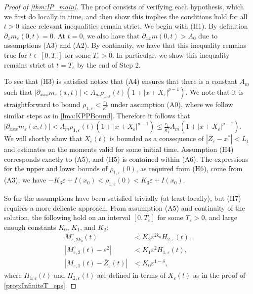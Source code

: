 \documentclass[]{article}
\theoremstyle{remark}
\begin{document}
\begin{proof}[{Proof of \cref{thm:IP_main}}]
The proof consists of verifying each hypothesis, which we first do locally in time, and then show this implies the conditions hold for all $t>0$ since relevant inequalities remain strict.  We begin with (H1). By definition $\partial_{x}m_{\varepsilon}(0,t)=0$. At $t=0$, we also have that $\partial_{xx}m(0,t)>A_0$ due to assumptions (A3) and (A2). By continuity, we have that this inequality remains true for $t\in[0,T_\varepsilon]$ for some $T_\varepsilon>0.$ In particular, we show this inequality remains strict at $t=T_\varepsilon$ by the end of Step 2.



To see that (H3) is satisfied notice that (A4) ensures that there is a constant ${A}_m$ such that $|\partial_{xxx}{m}_{\varepsilon}(x,t)|<A_m\rho_{1,\varepsilon}(t)(1+|x+X_\varepsilon|^{p-1})$. We note that it is straightforward to bound $\rho_{1,\varepsilon}<\frac{r_1}{\kappa^{*}}$ under assumption (A0), where we follow similar steps as in \cref{lma:KPPBound}. Therefore it follows that $|\partial_{xxx}{m}_{\varepsilon}(x,t)|<A_m\rho_{1,\varepsilon}(t)(1+|x+X_\varepsilon|^{p-1})\leq{}\frac{r_1}{\kappa_1^{*}}A_m(1+|x+X_\varepsilon|^{p-1})$. We will shortly show that $X_\varepsilon(t)$ is bounded as a consequence of $|\bar{Z}_\varepsilon-x^{*}|<L_1$ and estimates on the moments valid for some initial time.  Assumption (H4) corresponds exactly to (A5), and (H5) is contained within (A6). The expressions for the upper and lower bounds of $\rho_{1,\varepsilon}(0)$, as required from (H6), come from (A3); we have 
$-K_3\varepsilon+I(x_0)<\rho_{1,\varepsilon}(0)<K_3\varepsilon+I(x_0)$.



So far the assumptions have been satisfied trivially (at least locally), but (H7) requires a more delicate approach. From assumption (A5) and continuity of the solution, the following hold on an interval $[0,T_\varepsilon]$ for some $T_\varepsilon>0$, and large enough constants $K_0$, $K_1$, and $K_2$:
\begin{align}
 \label{eqn:M2kcloseIP} M^{c}_{\varepsilon,2k_0}(t) &  <  K_{2} \varepsilon^{2k_0}H_{2,\varepsilon}(t), \\
\label{eqn:M2closeIP} 
 \left | M_{\varepsilon,2}^{c}(t) -  \varepsilon^2  \right| & <  K_1\varepsilon^2 H_{1,\varepsilon}(t), \\
\label{eqn:M1closeIP} \left| M_{\varepsilon,1}(t) - \bar{Z}_{\varepsilon}(t) \right|  & <  K_0 \varepsilon^{1-{\delta}},
\end{align}
where $H_{1,\varepsilon}(t)$ and $H_{2,\varepsilon}(t)$ are defined in terms of $X_\varepsilon(t)$ as in the proof of \cref{prop:InfiniteT_eps}. 



\end{proof}
\end{document}
